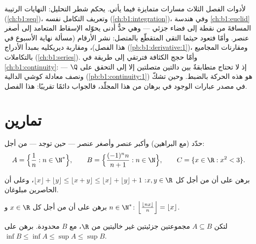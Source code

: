 \begin{remark}
لأدوات الفصل الثلاث مسارات متمايزة فيما يأتي.
 يحكم شطر التحليل: النهايات الرتيبة
(\cref{ch:b1:seq})، وتعريف التكامل نفسه
(\cref{ch:b1:integration})، وفي هندسة
\cref{ch:b1:euclid} المسافةَ من نقطة إلى فضاء جزئي ---
وهي حدٌّ أدنى يحوّله الإسقاط المتعامد إلى أصغر عنصر. وأمّا
 فتعود حيثما التقى المتقطّع
بالمتصل: نشر الأرقام (مسألة نهاية الأسبوع في هذا الفصل)،
ومقاربة ديريكليه بمبدأ الأدراج
(\cref{pb:b1:derivative:1})، ومقارنات المجاميع بالتكاملات
(\cref{ch:b1:series}). وأمّا حجج الكثافة فترتقي إلى طريقة
في \cref{ch:b1:continuity}: إذ لا تحتاج متطابقةٌ بين دالتين متصلتين
إلا إلى التحقق على $\Q$ --- ونصف معادلة كوشي
الدالية (\cref{pb:b1:continuity:1}) هو هذه الحركة بالضبط. وحين
تشكّ في مصدر عبارات الوجود في برهان من هذا المجلّد،
فالجواب دائمًا تقريبًا: هذا الفصل.
\end{remark}

\section{تمارين}

\begin{exercise}[$\star$]\label{exo:b1:reals:1}
حدّد (مع البراهين)   وأكبر عنصر وأصغر عنصر --- حين توجد --- من أجل:
\[
A = \Bigl\{\frac{1}{n} : n \in \N^*\Bigr\},
\qquad
B = \Bigl\{\frac{(-1)^n n}{n+1} : n \in \N\Bigr\},
\qquad
C = \{x \in \R : x^2 < 3\}.
\]
\end{exercise}

\begin{exercise}[$\star$]\label{exo:b1:reals:2}
برهن على أن من أجل كل $x, y \in \R$: $\lfloor x \rfloor + \lfloor y
\rfloor \leq \lfloor x + y \rfloor \leq \lfloor x \rfloor + \lfloor y
\rfloor + 1$، وعلى أن الحاصرين مبلوغان.
\end{exercise}

\begin{exercise}[$\star$]\label{exo:b1:reals:3}
برهن على أن من أجل كل $x \in \R$ و $n \in \N^*$:
$\Bigl\lfloor \frac{\lfloor nx \rfloor}{n} \Bigr\rfloor = \lfloor x
\rfloor$.
\end{exercise}

\begin{exercise}[$\star$]\label{exo:b1:reals:4}
لتكن $A \subseteq B$ مجموعتين جزئيتين غير خاليتين من $\R$، مع $B$ محدودة. برهن على
$\inf B \leq \inf A \leq \sup A \leq \sup B$.
\end{exercise}

